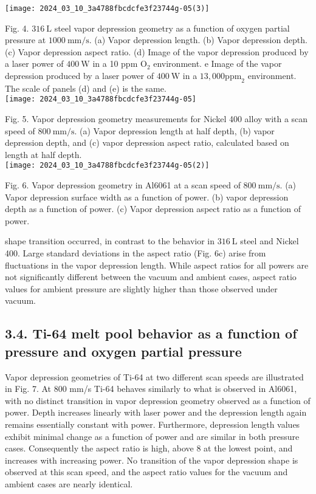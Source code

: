 \documentclass[10pt]{article}
\begin{document}
\begin{center}
\texttt{[image: 2024\_03\_10\_3a4788fbcdcfe3f23744g-05(3)]}
\end{center}

Fig. 4. $316 \mathrm{~L}$ steel vapor depression geometry as a function of oxygen partial pressure at $1000 \mathrm{~mm} / \mathrm{s}$. (a) Vapor depression length. (b) Vapor depression depth. (c) Vapor depression aspect ratio. (d) Image of the vapor depression produced by a laser power of $400 \mathrm{~W}$ in a 10 ppm $\mathrm{O}_{2}$ environment. e Image of the vapor depression produced by a laser power of $400 \mathrm{~W}$ in a $13,000 \mathrm{ppm}_{2}$ environment. The scale of panels (d) and (e) is the same.\\
\texttt{[image: 2024\_03\_10\_3a4788fbcdcfe3f23744g-05]}

Fig. 5. Vapor depression geometry measurements for Nickel 400 alloy with a scan speed of $800 \mathrm{~mm} / \mathrm{s}$. (a) Vapor depression length at half depth, (b) vapor depression depth, and (c) vapor depression aspect ratio, calculated based on length at half depth.\\
\texttt{[image: 2024\_03\_10\_3a4788fbcdcfe3f23744g-05(2)]}

Fig. 6. Vapor depression geometry in Al6061 at a scan speed of $800 \mathrm{~mm} / \mathrm{s}$. (a) Vapor depression surface width as a function of power. (b) vapor depression depth as a function of power. (c) Vapor depression aspect ratio as a function of power.

shape transition occurred, in contrast to the behavior in $316 \mathrm{~L}$ steel and Nickel 400. Large standard deviations in the aspect ratio (Fig. 6c) arise from fluctuations in the vapor depression length. While aspect ratios for all powers are not significantly different between the vacuum and ambient cases, aspect ratio values for ambient pressure are slightly higher than those observed under vacuum.

\subsection*{3.4. Ti-64 melt pool behavior as a function of pressure and oxygen partial pressure}
Vapor depression geometries of Ti-64 at two different scan speeds are illustrated in Fig. 7. At 800 mm/s Ti-64 behaves similarly to what is observed in Al6061, with no distinct transition in vapor depression geometry observed as a function of power. Depth increases linearly with laser power and the depression length again remains essentially constant with power. Furthermore, depression length values exhibit minimal change as a function of power and are similar in both pressure cases. Consequently the aspect ratio is high, above 8 at the lowest point, and increases with increasing power. No transition of the vapor depression shape is observed at this scan speed, and the aspect ratio values for the vacuum and ambient cases are nearly identical.
\end{document}
